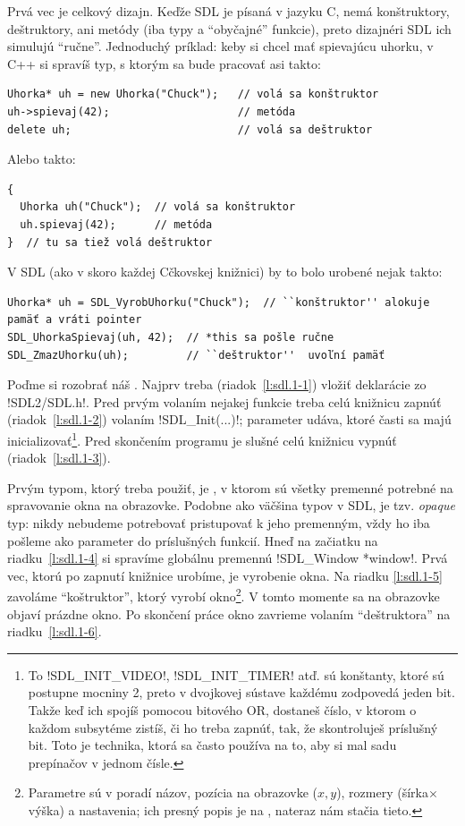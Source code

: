 Prvá vec je celkový dizajn. Keďže SDL je písaná v jazyku C, nemá konštruktory, deštruktory, ani metódy (iba typy a ``obyčajné'' funkcie),
preto dizajnéri SDL ich simulujú ``ručne''.
Jednoduchý príklad: keby si chcel mať spievajúcu uhorku, v C++ si spravíš typ, s ktorým sa bude pracovať asi takto:

\begin{lstlisting}
Uhorka* uh = new Uhorka("Chuck");   // volá sa konštruktor
uh->spievaj(42);                    // metóda
delete uh;                          // volá sa deštruktor
\end{lstlisting}

Alebo takto:

\begin{lstlisting}
{
  Uhorka uh("Chuck");  // volá sa konštruktor
  uh.spievaj(42);      // metóda
}  // tu sa tiež volá deštruktor
\end{lstlisting}

V SDL (ako v skoro každej Cčkovskej knižnici) by to bolo urobené nejak takto:

\begin{lstlisting}
Uhorka* uh = SDL_VyrobUhorku("Chuck");  // ``konštruktor'' alokuje pamäť a vráti pointer
SDL_UhorkaSpievaj(uh, 42);  // *this sa pošle ručne
SDL_ZmazUhorku(uh);         // ``deštruktor''  uvoľní pamäť
\end{lstlisting}

Poďme si rozobrať náš . Najprv treba (riadok~\ref{l:sdl.1-1}) vložiť deklarácie zo
\prg!SDL2/SDL.h!. Pred prvým volaním nejakej funkcie treba celú knižnicu zapnúť (riadok~\ref{l:sdl.1-2}) volaním
\prg!SDL_Init(...)!; parameter udáva, ktoré časti sa majú inicializovať\footnote{
  To \prg!SDL_INIT_VIDEO!, \prg!SDL_INIT_TIMER!  atď. sú konštanty, ktoré sú postupne mocniny 2,
  preto v dvojkovej sústave každému zodpovedá jeden bit. Takže keď ich spojíš
  pomocou bitového OR, dostaneš číslo, v ktorom o každom subsytéme zistíš, či ho treba zapnúť,
  tak, že skontroluješ príslušný bit. Toto je technika, ktorá sa často používa na to, aby
  si mal sadu prepínačov v jednom čísle.
}. Pred skončením programu je slušné celú knižnicu vypnúť (riadok~\ref{l:sdl.1-3}).

Prvým typom, ktorý treba použiť, 
je , v ktorom sú všetky premenné potrebné na spravovanie okna na obrazovke. Podobne ako väčšina typov v SDL, je
 tzv. {\em opaque} typ: nikdy nebudeme potrebovať pristupovať k jeho premenným, vždy ho iba pošleme ako parameter do príslušných funkcií.
Hneď na začiatku na riadku~\ref{l:sdl.1-4} si spravíme globálnu premennú \prg!SDL_Window *window!. Prvá vec, ktorú po zapnutí knižnice urobíme, je 
vyrobenie okna. Na riadku \ref{l:sdl.1-5} zavoláme ``koštruktor'', ktorý vyrobí okno\footnote{Parametre sú v poradí názov, pozícia na obrazovke ($x,y$),
rozmery (šírka$\times$výška) a nastavenia; ich
presný popis je na , nateraz nám stačia tieto.}. V tomto momente sa na obrazovke objaví prázdne okno. Po skončení práce okno zavrieme
volaním ``deštruktora'' na riadku~\ref{l:sdl.1-6}.

